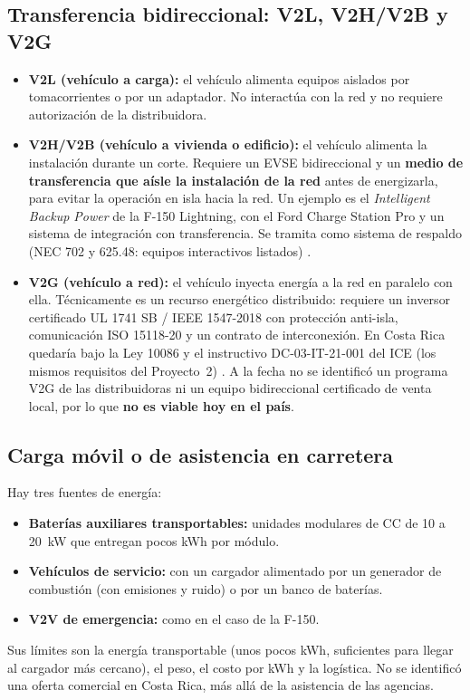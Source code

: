 \subsection{Transferencia bidireccional: V2L, V2H/V2B y V2G}
\begin{itemize}
\item \textbf{V2L (vehículo a carga):} el vehículo alimenta equipos aislados por tomacorrientes o por un adaptador. No interactúa con la red y no requiere autorización de la distribuidora.
\item \textbf{V2H/V2B (vehículo a vivienda o edificio):} el vehículo alimenta la instalación durante un corte. Requiere un EVSE bidireccional y un \textbf{medio de transferencia que aísle la instalación de la red} antes de energizarla, para evitar la operación en isla hacia la red. Un ejemplo es el \emph{Intelligent Backup Power} de la F-150 Lightning, con el Ford Charge Station Pro y un sistema de integración con transferencia. Se tramita como sistema de respaldo (NEC 702 y 625.48: equipos interactivos listados) \cite{nfpa70}.
\item \textbf{V2G (vehículo a red):} el vehículo inyecta energía a la red en paralelo con ella. Técnicamente es un recurso energético distribuido: requiere un inversor certificado UL 1741 SB / IEEE 1547-2018 con protección anti-isla, comunicación ISO 15118-20 y un contrato de interconexión. En Costa Rica quedaría bajo la Ley 10086 y el instructivo DC-03-IT-21-001 del ICE (los mismos requisitos del Proyecto~2) \cite{ley10086,iceIT}. A la fecha no se identificó un programa V2G de las distribuidoras ni un equipo bidireccional certificado de venta local, por lo que \textbf{no es viable hoy en el país}.
\end{itemize}

\subsection{Carga móvil o de asistencia en carretera}
Hay tres fuentes de energía:
\begin{itemize}
\item \textbf{Baterías auxiliares transportables:} unidades modulares de CC de 10 a \SI{20}{\kilo\watt} que entregan pocos kWh por módulo.
\item \textbf{Vehículos de servicio:} con un cargador alimentado por un generador de combustión (con emisiones y ruido) o por un banco de baterías.
\item \textbf{V2V de emergencia:} como en el caso de la F-150.
\end{itemize}
Sus límites son la energía transportable (unos pocos kWh, suficientes para llegar al cargador más cercano), el peso, el costo por kWh y la logística. No se identificó una oferta comercial en Costa Rica, más allá de la asistencia de las agencias.

